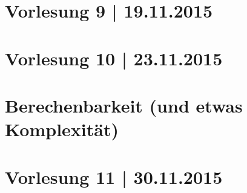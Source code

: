 \newpage
\part*{Vorlesung 9 | 19.11.2015}

\newpage
\part*{Vorlesung 10 | 23.11.2015}


\newpage
\part[Berechenbarkeit]{Berechenbarkeit {\large (und etwas Komplexität)}}

\part*{Vorlesung 11 | 30.11.2015}













